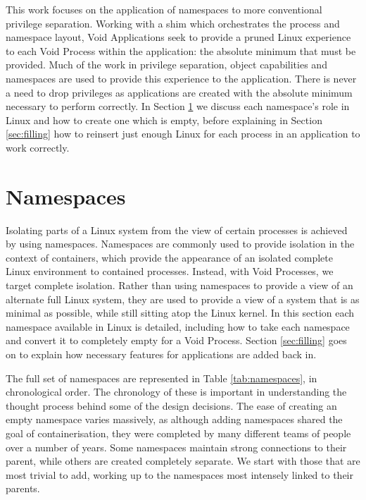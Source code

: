\documentclass[sigplan]{acmart}
\begin{document}
This work focuses on the application of namespaces to more conventional privilege separation. Working with a shim which orchestrates the process and namespace layout, Void Applications seek to provide a pruned Linux experience to each Void Process within the application: the absolute minimum that must be provided. Much of the work in privilege separation, object capabilities and namespaces are used to provide this experience to the application. There is never a need to drop privileges as applications are created with the absolute minimum necessary to perform correctly. In Section \ref{sec:voiding} we discuss each namespace's role in Linux and how to create one which is empty, before explaining in Section \ref{sec:filling} how to reinsert just enough Linux for each process in an application to work correctly.


\section{Namespaces}
\label{sec:voiding}

Isolating parts of a Linux system from the view of certain processes is achieved by using namespaces. Namespaces are commonly used to provide isolation in the context of containers, which provide the appearance of an isolated complete Linux environment to contained processes. Instead, with Void Processes, we target complete isolation. Rather than using namespaces to provide a view of an alternate full Linux system, they are used to provide a view of a system that is as minimal as possible, while still sitting atop the Linux kernel. In this section each namespace available in Linux is detailed, including how to take each namespace and convert it to completely empty for a Void Process. Section \ref{sec:filling} goes on to explain how necessary features for applications are added back in.

The full set of namespaces are represented in Table \ref{tab:namespaces}, in chronological order. The chronology of these is important in understanding the thought process behind some of the design decisions. The ease of creating an empty namespace varies massively, as although adding namespaces shared the goal of containerisation, they were completed by many different teams of people over a number of years. Some namespaces maintain strong connections to their parent, while others are created completely separate. We start with those that are most trivial to add, working up to the namespaces most intensely linked to their parents.
\end{document}
